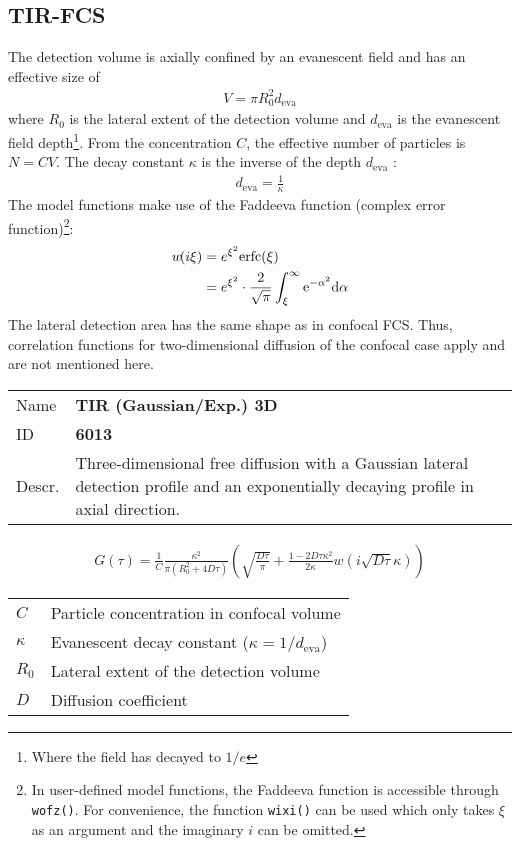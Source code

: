 \subsection{TIR-FCS}
\label{sec:imple.tirfc}
The detection volume is axially confined by an evanescent field and has an effective size of
\begin{align}
V = \pi R_0^2 d_\mathrm{eva}
\end{align} 
where $R_0$ is the lateral extent of the detection volume and $d_\mathrm{eva}$ is the evanescent field depth\footnote{Where the field has decayed to $1/e$}. From the concentration $C$, the effective number of particles is $N=CV$.
The decay constant $\kappa$ is the inverse of the depth $d_\mathrm{eva}$ :
\begin{align}
d_\mathrm{eva} = \frac{1}{\kappa}
\end{align} 
The model functions make use of the Faddeeva function (complex error function)\footnote{In user-defined model functions, the Faddeeva function is accessible through \texttt{wofz()}. For convenience, the function \texttt{wixi()} can be used which only takes $\xi$ as an argument and the imaginary $i$ can be omitted.}:
\begin{align}
w\!(i\xi) &= e^{\xi^2} \mathrm{erfc}(\xi) \\
\notag &= e^{\xi^2} \cdot  \frac{2}{\sqrt{\pi}} \int_\xi^\infty \mathrm{e}^{-\alpha^2} \mathrm{d\alpha} \label{eq:faddeeva}
\end{align} 
The lateral detection area has the same shape as in confocal FCS. Thus, correlation functions for two-dimensional diffusion of the confocal case apply and are not mentioned here. \\
\vspace{2em}


\noindent \begin{tabular}{lp{}}
Name & \textbf{TIR (Gaussian/Exp.) 3D} \\ 
ID & \textbf{6013} \\ 
Descr. &  Three-dimensional free diffusion with a Gaussian lateral detection profile and an exponentially decaying profile in axial direction\cite{Starr2001, Hassler2005, Ohsugi2006}. \\ 
\end{tabular}
\begin{align}
G(\tau) = \frac{1}{C}  \frac{ \kappa^2}{ \pi (R_0^2 +4D\tau)}
 \left( \sqrt{\frac{D \tau}{\pi}} + \frac{1 - 2 D \tau \kappa^2}{2 \kappa}  w\!\left(i \sqrt{D \tau} \kappa\right) \right)
\end{align} 
\begin{center}
\begin{tabular}{ll}
$C$ & Particle concentration in confocal volume \\ 
$\kappa$ &  Evanescent decay constant ($\kappa = 1/d_\mathrm{eva}$)\\ 
$R_0$ & Lateral extent of the detection volume \\
$D$ & Diffusion coefficient  \\
\end{tabular}
\end{center}
\vspace{2em}


